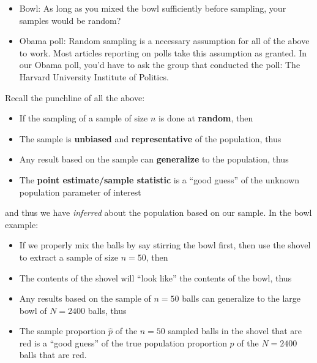 \documentclass[12pt,]{krantz}
\providecommand{\tightlist}{%
  \setlength{\itemsep}{0pt}\setlength{\parskip}{0pt}}
\renewenvironment{quote}{\begin{VF}}{\end{VF}}
\begin{document}
\begin{enumerate}
  \begin{itemize}
  \tightlist
  \item
    Bowl: As long as you mixed the bowl sufficiently before sampling,
    your samples would be random?
  \item
    Obama poll: Random sampling is a necessary assumption for all of the
    above to work. Most articles reporting on polls take this assumption
    as granted. In our Obama poll, you'd have to ask the group that
    conducted the poll: The Harvard University Institute of Politics.
  \end{itemize}
\end{enumerate}

Recall the punchline of all the above:

\begin{quote}
\begin{itemize}
\tightlist
\item
  If the sampling of a sample of size \(n\) is done at \textbf{random},
  then
\item
  The sample is \textbf{unbiased} and \textbf{representative} of the
  population, thus
\item
  Any result based on the sample can \textbf{generalize} to the
  population, thus
\item
  The \textbf{point estimate/sample statistic} is a ``good guess'' of
  the unknown population parameter of interest
\end{itemize}
\end{quote}

and thus we have \emph{inferred} about the population based on our
sample. In the bowl example:

\begin{quote}
\begin{itemize}
\tightlist
\item
  If we properly mix the balls by say stirring the bowl first, then use
  the shovel to extract a sample of size \(n=50\), then
\item
  The contents of the shovel will ``look like'' the contents of the
  bowl, thus
\item
  Any results based on the sample of \(n=50\) balls can generalize to
  the large bowl of \(N=2400\) balls, thus
\item
  The sample proportion \(\widehat{p}\) of the \(n=50\) sampled balls in
  the shovel that are red is a ``good guess'' of the true population
  proportion \(p\) of the \(N=2400\) balls that are red.
\end{itemize}
\end{quote}
\end{document}

